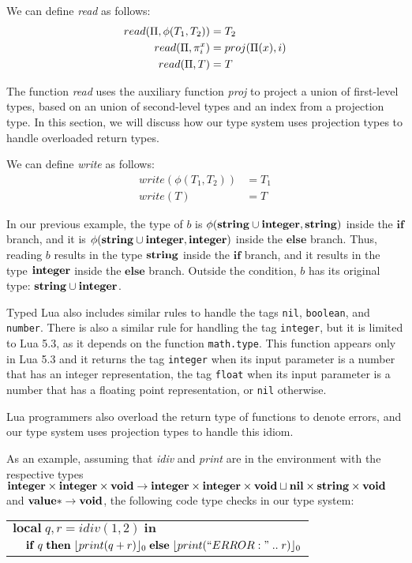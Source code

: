 We can define \emph{read} as follows:
\begin{align*}
read(\Pi, \phi(T_{1},T_{2})) & = T_{2}\\
read(\Pi, \pi_{i}^{x}) & = proj(\Pi(x), i)\\
read(\Pi, T) & = T
\end{align*}

The function \emph{read} uses the auxiliary function \emph{proj}
to project a union of first-level types, based on an union of
second-level types and an index from a projection type.
In this section, we will discuss how our type system uses
projection types to handle overloaded return types.

We can define \emph{write} as follows:
\begin{align*}
write(\phi(T_{1},T_{2})) & = T_{1}\\
write(T) & = T
\end{align*}

In our previous example, the type of $b$ is
$\phi(\mathbf{string} \cup \mathbf{integer}, \mathbf{string})$ inside the $\mathbf{if}$ branch,
and it is $\phi(\mathbf{string} \cup \mathbf{integer}, \mathbf{integer})$ inside the $\mathbf{else}$ branch.
Thus, reading $b$ results in the type $\mathbf{string}$ inside the $\mathbf{if}$ branch,
and it results in the type $\mathbf{integer}$ inside the $\mathbf{else}$ branch.
Outside the condition, $b$ has its original type: $\mathbf{string} \cup \mathbf{integer}$.

Typed Lua also includes similar rules to handle the tags \texttt{nil},
\texttt{boolean}, and \texttt{number}.
There is also a similar rule for handling the tag \texttt{integer}, but
it is limited to Lua 5.3, as it depends on the function \texttt{math.type}.
This function appears only in Lua 5.3 and it returns the tag \texttt{integer}
when its input parameter is a number that has an integer representation,
the tag \texttt{float} when its input parameter is a number that has a
floating point representation, or \texttt{nil} otherwise.

Lua programmers also overload the return type of functions to denote errors,
and our type system uses projection types to handle this idiom.

As an example, assuming that \emph{idiv} and \emph{print} are in the
environment with the respective types
$\mathbf{integer} \times \mathbf{integer} \times \mathbf{void} \rightarrow \mathbf{integer} \times \mathbf{integer} \times \mathbf{void} \sqcup \mathbf{nil} \times \mathbf{string} \times \mathbf{void}$
and
$\mathbf{value}{*} \rightarrow \mathbf{void}$,
the following code type checks in our type system:
\begin{center}
\begin{tabular}{ll}
\multicolumn{2}{l}{$\mathbf{local} \; q, r = idiv(1, 2) \; \mathbf{in}$}\\
& \multicolumn{1}{l}{$\mathbf{if} \; q \; \mathbf{then} \; \lfloor print(q + r) \rfloor_{0} \; \mathbf{else} \; \lfloor print(``ERROR: " \; .. \; r) \rfloor_{0}$}
\end{tabular}
\end{center}

